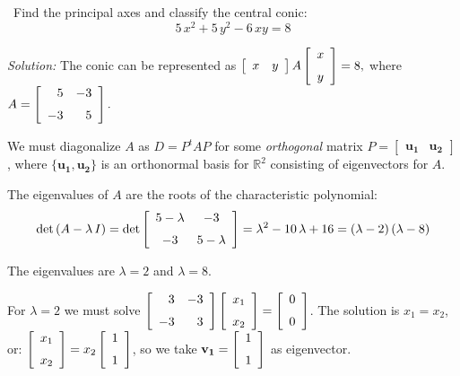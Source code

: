 \documentclass[12pt]{article}
\newcommand{\solution}[2]{\ifthenelse{\boolean{showsol}}%
{\vskip10pt\noindent\emph{Solution:}\vskip10pt #2}{\vskip #1}}
\newcounter{question}
\newcommand{\question}{\addtocounter{question}{1}%
                          \pnum{\thequestion}\ }
\newcommand{\pnum}[1]{\noindent {\hskip -18pt \bfseries #1.}}
\begin{document}

\question Find the principal axes and classify the central conic:
\[
5\,x^2 + 5\,y^2 - 6\,xy = 8
\]

\solution{3in}{
The conic can be represented as 
$\displaystyle{
\left [\begin{array}{cc} x&y\end{array}\right ]
A
\left [\begin {array}{c} x\\\noalign{\medskip}y\end {array}\right ]
= 8},$
where 
$\displaystyle{
A = 
\left [\begin {array}{rr} 5&-3\\\noalign{\medskip}-3&5\end {array}
\right ] .
}$

We must diagonalize $A$ as $D = P^{t} A P$ for some \emph{orthogonal} 
matrix 
$\displaystyle{P = 
\left [\begin{array}{cc} \mathbf{u_1}&\mathbf{u_2}\end{array}\right ]}
$,
where $\{\mathbf{u_1},\mathbf{u_2}\}$ is an orthonormal basis for 
$\mathbb{R}^2$ consisting of eigenvectors for $A$. 

The eigenvalues of $A$ are the roots of the characteristic polynomial:
\[
\det\left(A-\lambda\,I\right) =
\det 
\left [\begin {array}{cc} 5-\lambda&-3\\
\noalign{\medskip}-3&5-\lambda\end {array}
\right ]
= {\lambda}^{2}-10\,\lambda+16
= (\lambda -2)\,(\lambda-8)
\]

The eigenvalues are $\lambda=2$ and $\lambda=8$.

For $\lambda=2$ we must solve 
$\displaystyle{
\left [\begin {array}{rr} 3&-3\\
\noalign{\medskip}-3&3\end {array}
\right ]
\left [\begin {array}{c} x_1\\\noalign{\medskip}x_2
\end {array}\right ]
=
\left [\begin {array}{c} 0\\\noalign{\medskip}0
\end {array}\right ]
}$.
The solution is $x_1 = x_2$, or:
$\displaystyle{
\left [\begin {array}{r} x_{{1}}\\\noalign{\medskip}x_{{2}}
\end {array}\right ]=x_{{2}}\left [\begin {array}{c} 1
\\\noalign{\medskip}1\end {array}\right ]
}$, so we take 
$\displaystyle{\mathbf{v_1} = 
\left [\begin {array}{c} 1
\\\noalign{\medskip}1\end {array}\right ]
}$ as eigenvector.

}
\end{document}

